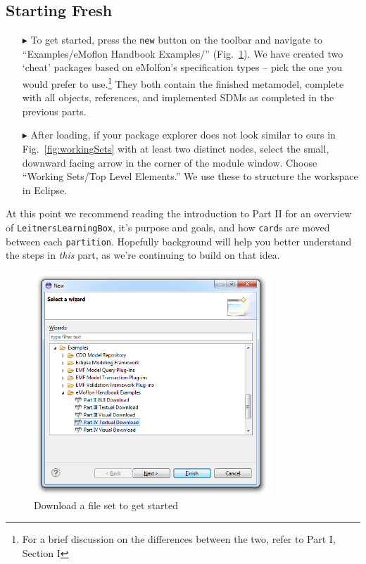 \subsection{Starting Fresh}
\label{sec:loadSourceMeta}
\begin{itemize}

\item[$\blacktriangleright$] To get started, press the \texttt{new} button on the toolbar and navigate to ``Examples/eMoflon Handbook Examples/''
(Fig.~\ref{fig:downPartIV}).  We have created two `cheat' packages based on eMolfon's specification types --  pick the one you would prefer to use.\footnote{For
a brief discussion on the differences between the two, refer to Part I, Section I} They both contain the finished metamodel, complete with all objects,
references, and implemented SDMs as completed in the previous parts.

\item[$\blacktriangleright$] After loading, if your package explorer does not look similar to ours in Fig.~\ref{fig:workingSets} with at least two distinct
nodes, select the small, downward facing arrow in the corner of the module window. Choose ``Working Sets/Top Level Elements.'' We use these to structure the
workspace in Eclipse.

\end{itemize}

At this point we recommend reading the introduction to Part II for an overview of \texttt{LeitnersLearningBox}, it's purpose and goals, and how \texttt{card}s
are moved between each \texttt{partition}. Hopefully background will help you better understand the steps in \emph{this} part, as we're continuing to build on
that idea. 

\begin{figure}[htbp]
\begin{center}
  \includegraphics[width=0.8\textwidth]{eclipse_downloadWizardPartIV}
  \caption{Download a file set to get started}
  \label{fig:downPartIV}
\end{center}
\end{figure}

